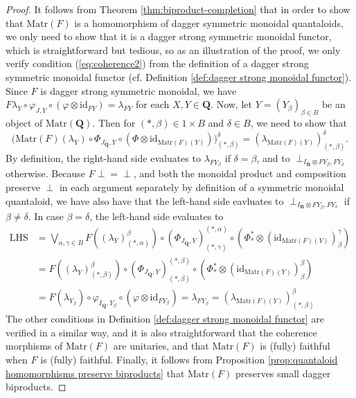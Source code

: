 \documentclass[12pt]{tac}
\theoremstyle{definition}
\theoremstyle{remark}
\newcommand{\<}{\langle}
\renewcommand{\>}{\rangle}
\renewcommand{\:}{\colon}
\newcommand{\id}{\mathrm{id}}
\begin{document}
\begin{proof}
It follows from Theorem \ref{thm:biproduct-completion} that in order to show that $\mathrm{Matr}(F)$ is a homomorphism of dagger symmetric monoidal quantaloids, we only need to show that it is a dagger strong symmetric monoidal functor, which is straightforward but tedious, so as an illustration of the proof, we only verify condition (\ref{eq:coherence2}) from the definition of a dagger strong symmetric monoidal functor (cf.  Definition \ref{def:dagger strong monoidal functor}). Since $F$ is  dagger strong symmetric monoidal, we have $F\lambda_Y\circ\varphi_{J,Y}\circ (\varphi\otimes\id_{FY}) = \lambda_{FY}$ for each $X,Y\in\mathbf Q$. Now, let  $Y=(Y_\beta)_{\beta\in B}$ be an object of $\mathrm{Matr}(\mathbf Q)$. Then for $(*,\beta)\in 1\times B$ and $\delta\in B$, we need to show that 
\[\big(\mathrm{Matr}(F)(\lambda_Y) \circ\Phi_{J_\mathbf Q,Y}\circ (\Phi\otimes\id_{\mathrm{Matr}(F)(Y)})\big)_{(*,\beta)}^\delta=(\lambda_{\mathrm{Matr}(F)(Y)})_{(*,\beta)}^\delta.\]
By definition, the right-hand side evaluates to $\lambda_{FY_\beta}$ if $\delta=\beta$, and to $\perp_{I_\mathbf R\otimes FY_\beta,FY_\delta}$ otherwise.
Because $F\perp=\perp$, and both the monoidal product and composition preserve $\perp$ in each argument separately by definition of a symmetric monoidal quantaloid, we have also have that the left-hand side eavluates to $\perp_{I_\mathbf R\otimes FY_\beta,FY_\delta}$ if $\beta\neq\delta$. In case $\beta=\delta$, the left-hand side evaluates to 
\begin{align*} \mathrm{LHS}& =\bigvee_{\alpha,\gamma\in B}F((\lambda_{Y})_{(*,\alpha)}^\beta)\circ (\Phi_{J_\mathbf Q,Y})_{(*,\gamma)}^{(*,\alpha)}\circ(\Phi_*^*\otimes(\id_{\mathrm{Matr}(F)(Y)})_{\beta}^\gamma)
\\
& = F((\lambda_{Y})_{(*,\beta)}^\beta)\circ (\Phi_{J_\mathbf Q,Y})_{(*,\beta)}^{(*,\beta)}\circ(\Phi_*^*\otimes(\id_{\mathrm{Matr}(F)(Y)})_{\beta}^\beta)\\
& = F(\lambda_{Y_\beta})\circ \varphi_{I_\mathbf Q,Y_\beta}\circ(\varphi\otimes
\id_{FY_\beta})=\lambda_{FY_\beta}=(\lambda_{\mathrm{Matr}(F)(Y)})_{(*,\beta)}^\beta
\end{align*}
The other conditions in Definition \ref{def:dagger strong monoidal functor} are verified in a similar way, and it is also  straightforward that the coherence morphisms of $\mathrm{Matr}(F)$ are unitaries, and that $\mathrm{Matr}(F)$ is (fully) faithful when $F$ is (fully) faithful. Finally, it follows from Proposition \ref{prop:quantaloid homomorphisms preserve biproducts} that $\mathrm{Matr}(F)$ preserves small dagger biproducts. 
\end{proof}
\end{document}
